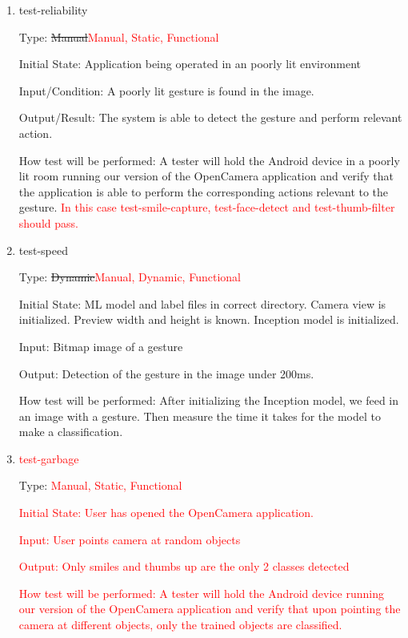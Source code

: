 \documentclass[12pt, titlepage]{article}
\begin{document}
\begin{enumerate}

\item{test-reliability\\}

Type: \sout{Manual}\textcolor{red}{Manual, Static, Functional}
					
Initial State: Application being operated in an poorly lit environment
				
Input/Condition: A poorly lit gesture is found in the image.
					
Output/Result: The system is able to detect the gesture and perform relevant action.
					
How test will be performed: A tester will hold the Android device in a poorly lit room running our version of the OpenCamera application and verify that the application is able to perform the corresponding actions relevant to the gesture. \textcolor{red}{In this case test-smile-capture, test-face-detect and test-thumb-filter should pass.}
					
\item{test-speed\\}

Type: \sout{Dynamic}\textcolor{red}{Manual, Dynamic, Functional}
					
Initial State: ML model and label files in correct directory. Camera view is initialized. Preview width and height is known. Inception model is initialized. 
					
Input: Bitmap image of a gesture
					
Output: Detection of the gesture in the image under 200ms.
					
How test will be performed: After initializing the Inception model, we feed in an image with a gesture. Then measure the time it takes for the model to make a classification.

\item{\textcolor{red}{ test-garbage}\\}

Type: \textcolor{red}{Manual, Static, Functional}
					
\textcolor{red}{Initial State: 
    User has opened the OpenCamera application.}
					
\textcolor{red}{Input: User points camera at random objects}
					
\textcolor{red}{Output: Only smiles and thumbs up are the only 2 classes detected }
					
\textcolor{red}{How test will be performed: A tester will hold the Android device running our version of the OpenCamera application and verify that upon pointing the camera at different objects, only the trained objects are classified.}

\end{enumerate}
\end{document}
